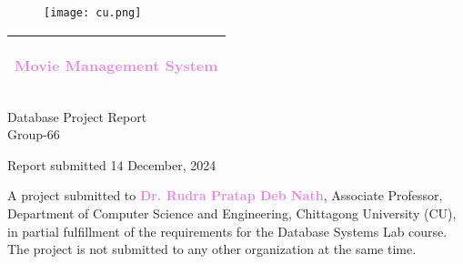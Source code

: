 \documentclass[a4paper,12pt]{article}  %
\renewcommand{\textbf}[1]{\textcolor{violet}{\bfseries #1}}
\begin{document}
\begin{titlepage}

\begin{figure}[h]
    \centering
    \texttt{[image: cu.png]}
\end{figure}

\vspace{1cm}

\noindent
\begin{tabular}{@{}p{\textwidth}@{}}
    \hline
    \hline
    \vspace{0.2cm}
    \begin{center}
        \Huge{\textbf{Movie Management System}} %
    \end{center}
    \vspace{0.2cm}\\
    \hline
    \hline
\end{tabular}

\vspace{4cm}

\begin{center}
    {\large Database Project Report} %
    \\
    {\Large Group-66} %
\end{center}

\vfill

\begin{center}
    Report submitted 14 December, 2024
\end{center}

\vfill

\noindent A project submitted to \textbf{Dr. Rudra Pratap Deb Nath}, Associate Professor, Department of Computer Science and Engineering, Chittagong University (CU), in partial fulfillment of the requirements for the Database Systems Lab course. The project is not submitted to any other organization at the same time.

\end{titlepage}
\clearpage

\begin{table}[t]
\centering
\caption{Details of Group-XX} %

\end{table}
\clearpage
\end{document}
